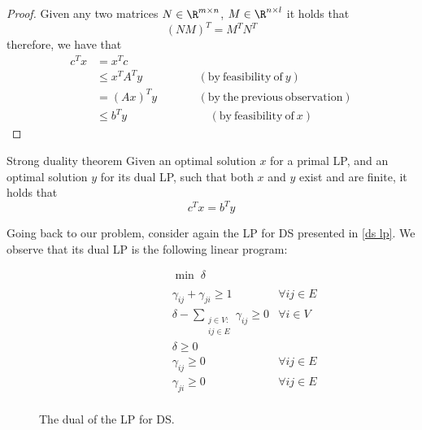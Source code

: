 \documentclass[a4paper, 12pt]{report}
\begin{document}
    \begin{proof}
        Given any two matrices $N \in \R^{m \times n}$, $M \in \R^{n \times l}$ it holds that $$(NM)^T = M^TN^T$$ therefore, we have that
        \begin{equation*}
            \begin{alignedat}{2}
                c^Tx &= x^Tc && \\
                     &\le x^TA^Ty && \quad \quad (\mathrm{by \ feasibility \ of} \ y) \\
                     &= (Ax)^Ty && \quad \quad (\mathrm{by \ the \ previous \ observation}) \\
                     &\le b^Ty && \quad \quad \quad (\mathrm{by \ feasibility \ of} \ x)
            \end{alignedat}
        \end{equation*}
    \end{proof}

    \begin{framedthm}{Strong duality theorem}
        Given an optimal solution $x$ for a primal LP, and an optimal solution $y$ for its dual LP, such that both $x$ and $y$ exist and are finite, it holds that $$c^Tx = b^Ty$$
    \end{framedthm}

    Going back to our problem, consider again the LP for DS presented in \cref{ds lp}. We observe that its dual LP is the following linear program:

    \begin{figure}[H]
        \centering
        \[\begin{array}{ccl}
            \qquad\qquad\quad
            & \min \; \delta \\\\
            & \gamma_{ij} + \gamma_{ji} \ge 1 & \forall i j \in E \\
            & \delta - \sum\limits_{\substack{j \in V : \\ ij \in E}}{\gamma_{ij}} \ge 0 & \forall i \in V \\
            & \delta \ge 0 \\
            & \gamma_{ij} \ge 0 & \forall i j \in E \\
            & \gamma_{ji} \ge 0 & \forall i j \in E \\
        \end{array}\]
        \caption{The dual of the LP for DS.}
    \end{figure}
    
\end{document}
